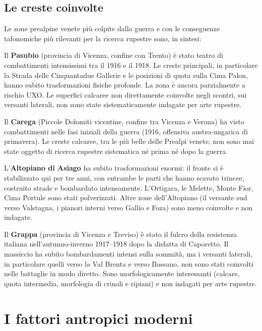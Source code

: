 \subsection{Le creste coinvolte}

Le zone prealpine venete più colpite dalla guerra e con le conseguenze tafonomiche più rilevanti per la ricerca rupestre sono, in sintesi:

Il \textbf{Pasubio} (provincia di Vicenza, confine con Trento) è stato teatro di combattimenti intensissimi tra il 1916 e il 1918. Le creste principali, in particolare la Strada delle Cinquantadue Gallerie e le posizioni di quota sulla Cima Palon, hanno subito trasformazioni fisiche profonde. La zona è ancora parzialmente a rischio UXO. Le superfici calcaree non direttamente coinvolte negli scontri, sui versanti laterali, non sono state sistematicamente indagate per arte rupestre.

Il \textbf{Carega} (Piccole Dolomiti vicentine, confine tra Vicenza e Verona) ha visto combattimenti nelle fasi iniziali della guerra (1916, offensiva austro-ungarica di primavera). Le creste calcaree, tra le più belle delle Prealpi venete, non sono mai state oggetto di ricerca rupestre sistematica né prima né dopo la guerra.

L'\textbf{Altopiano di Asiago} ha subito trasformazioni enormi: il fronte si è stabilizzato qui per tre anni, con entrambe le parti che hanno scavato trincee, costruito strade e bombardato intensamente. L'Ortigara, le Melette, Monte Fior, Cima Portule sono stati polverizzati. Altre zone dell'Altopiano (il versante sud verso Valstagna, i pianori interni verso Gallio e Foza) sono meno coinvolte e non indagate.

Il \textbf{Grappa} (provincia di Vicenza e Treviso) è stato il fulcro della resistenza italiana nell'autunno-inverno 1917--1918 dopo la disfatta di Caporetto. Il massiccio ha subito bombardamenti intensi sulla sommità, ma i versanti laterali, in particolare quelli verso la Val Brenta e verso Bassano, non sono stati coinvolti nelle battaglie in modo diretto. Sono morfologicamente interessanti (calcare, quota intermedia, morfologia di crinali e ripiani) e non indagati per arte rupestre.

\section{I fattori antropici moderni}

